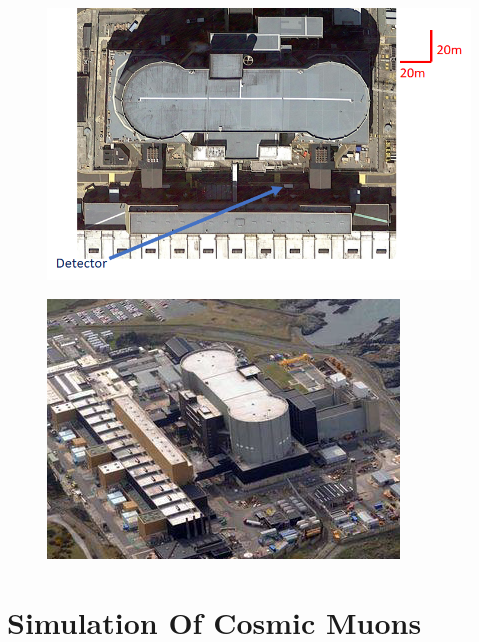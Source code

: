 \begin{figure}[htbp]
 \centering
 \includegraphics[width=0.7\linewidth]{Chapter5/Figs/wylfaRasterNew/DetectorPositionTopDown.png}
 \label{fig:DetectorPositionTopDown}
\end{figure}

\begin{figure}[htbp]
 \centering
 \includegraphics[width=0.7\linewidth]{Chapter5/Figs/Raster/wylfaArielView.png}
 \label{fig:wylfaAir}
\end{figure}

\section{Simulation Of Cosmic Muons}\label{sec:SimulationOfCosmics}

